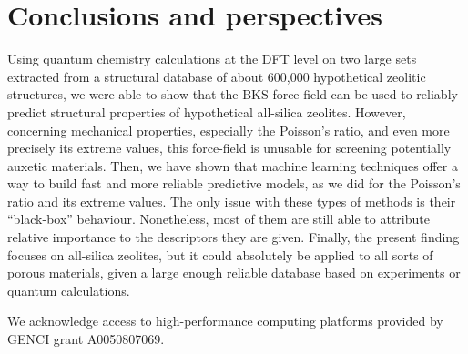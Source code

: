 \documentclass[journal=jacsat,manuscript=article]{achemso}
\begin{document}
\section{Conclusions and perspectives}

Using quantum chemistry calculations at the DFT level on two large sets extracted from a structural database of about 600,000 hypothetical zeolitic structures, we were able to show that the BKS force-field can be used to reliably predict structural properties of hypothetical all-silica zeolites. However, concerning mechanical properties, especially the Poisson's ratio, and even more precisely its extreme values, this force-field is unusable for screening potentially auxetic materials. Then, we have shown that machine learning techniques offer a way to build fast and more reliable predictive models, as we did for the Poisson's ratio and its extreme values. The only issue with these types of methods is their ``black-box'' behaviour. Nonetheless, most of them are still able to attribute relative importance to the descriptors they are given. Finally, the present finding focuses on all-silica zeolites, but it could absolutely be applied to all sorts of porous materials, given a large enough reliable database based on experiments or quantum calculations.


\begin{acknowledgement}
We acknowledge access to high-performance computing platforms provided by GENCI grant A0050807069.
\end{acknowledgement}

\begin{suppinfo}



\end{suppinfo}


\end{document}
